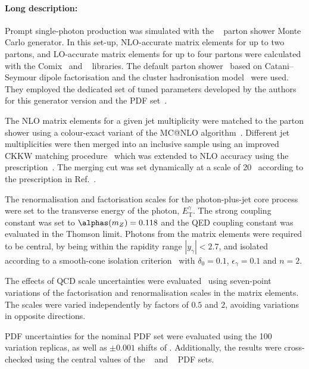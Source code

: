 \paragraph{Long description:}

Prompt single-photon production was simulated with the
\SHERPA[2.2]~\cite{Bothmann:2019yzt} parton shower Monte Carlo
generator. In this set-up, NLO-accurate
matrix elements for up to two partons, and LO-accurate matrix elements for up
to four partons were calculated with the Comix~\cite{Gleisberg:2008fv} and
\OPENLOOPS~\cite{Buccioni:2019sur,Cascioli:2011va,Denner:2016kdg} libraries.
The default \SHERPA parton shower~\cite{Schumann:2007mg} based on
Catani--Seymour dipole factorisation and the cluster hadronisation model~\cite{Winter:2003tt}
were used. They employed the dedicated set of tuned parameters developed by the
\SHERPA authors for this generator version and the \NNPDF[3.0nnlo] PDF
set~\cite{Ball:2014uwa}.

The NLO matrix elements for a given jet multiplicity were matched to the parton
shower using a colour-exact variant of the MC@NLO
algorithm~\cite{Hoeche:2011fd}. Different jet multiplicities were then merged
into an inclusive sample using an improved CKKW matching
procedure~\cite{Catani:2001cc,Hoeche:2009rj} which was extended to NLO
accuracy using the \MEPSatNLO prescription~\cite{Hoeche:2012yf}.
The merging cut was set dynamically at a scale of 20~\GeV{}
according to the prescription in Ref.~\cite{Siegert:2016bre}.

The renormalisation and factorisation scales for the photon-plus-jet core
process were set to the transverse energy of the photon, $E_\text{T}^\gamma$.
The strong coupling constant was set to $\alphas (m_Z)= 0.118$ and the QED coupling
constant was evaluated in the Thomson limit. Photons from the matrix elements were required 
to be central, by being within the rapidity range $|y_{\gamma}|<2.7$, and isolated according to a 
smooth-cone isolation criterion~\cite{Frixione:1998jh} with $\delta_0=0.1$, $\epsilon_{\gamma}=0.1$ and $n=2$.

The effects of QCD scale uncertainties were evaluated~\cite{Bothmann:2016nao} using
seven-point variations of the factorisation and renormalisation scales in the matrix elements.
The scales were varied independently by factors of $0.5$ and $2$, avoiding variations in opposite directions.

PDF uncertainties for the nominal PDF set were
evaluated using the 100 variation replicas, as well as $\pm 0.001$ shifts
of \alphas. Additionally, the results were cross-checked using the central values of the 
\CT[14nnlo]~\cite{Dulat:2015mca} and \MMHT[nnlo]~\cite{Harland-Lang:2014zoa} 
PDF sets.

